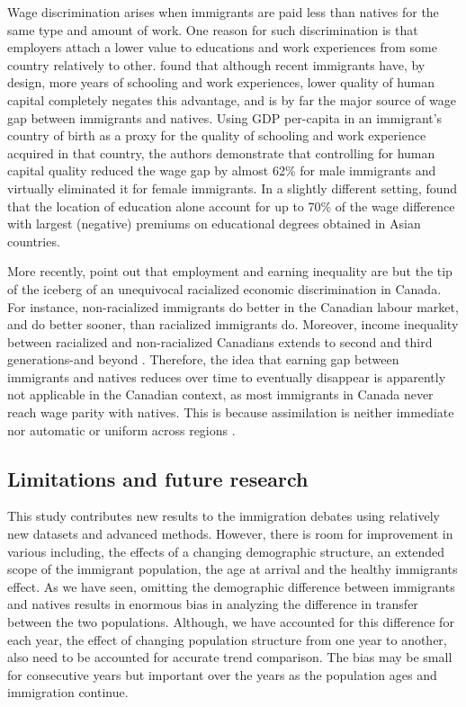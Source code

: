 \vspace{0.7em}\par
Wage discrimination arises when immigrants are paid less than natives for the same type and amount of work.
One reason for such discrimination is that employers attach a lower value to educations and work experiences from some country relatively to other.
\citet{Coulombe:2014ir} found that although recent immigrants have, by design, more years of schooling and work experiences, lower quality of human capital completely negates this advantage, and is by far the major source of wage gap between immigrants and natives.
Using GDP per-capita in an immigrant's country of birth as a proxy for the quality of schooling and work experience acquired in that country, the authors demonstrate that controlling for human capital quality reduced the wage gap by almost 62\% for male immigrants and virtually eliminated it for female immigrants.
In a slightly different setting, \citet{Fortin:2016hl} found that the location of education alone account for up to 70\% of the wage difference with largest (negative) premiums on educational degrees obtained in Asian countries.

\vspace{0.7em}\par
More recently,  \citet{Block:2019va} point out that employment and earning inequality are but the tip of the iceberg of an unequivocal racialized economic discrimination in Canada.
For instance, non-racialized immigrants do better in the Canadian labour market, and do better sooner, than racialized immigrants do.
Moreover, income inequality between racialized and non-racialized Canadians extends to second and third generations-and beyond \citep{Block:2019va}.
Therefore, the idea that earning gap between immigrants and natives reduces over time to eventually disappear is apparently not applicable in the Canadian context, as most immigrants in Canada never reach wage parity with natives.
This is because assimilation is neither immediate nor automatic \citep{Hum:2000gz} or uniform across regions \citep{Nadeau:2010jd}.


\subsection{Limitations and future research}

This study contributes new results to the immigration debates using relatively new datasets and advanced methods.
However, there is room for improvement in various including, the effects of a changing demographic structure, an extended scope of the immigrant population, the age at arrival and the healthy immigrants effect.
As we have seen, omitting the demographic difference between immigrants and natives results in enormous bias in analyzing the difference in transfer between the two populations.
Although, we have accounted for this difference for each year, the effect of changing population structure from one year to another, also need to be accounted for accurate trend comparison.
The bias may be small for consecutive years but important over the years as the population ages and immigration continue.

